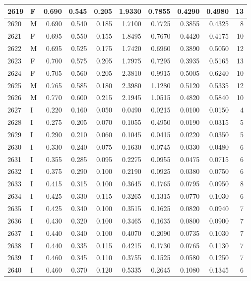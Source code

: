 \documentclass[9pt,twocolumn,twoside,]{pnas-new}
\begin{document}
\begin{tabular}{l|l|r|r|r|r|r|r|r|r}
\hline
2619 & F & 0.690 & 0.545 & 0.205 & 1.9330 & 0.7855 & 0.4290 & 0.4980 & 13\\
\hline
2620 & M & 0.690 & 0.540 & 0.185 & 1.7100 & 0.7725 & 0.3855 & 0.4325 & 8\\
\hline
2621 & F & 0.695 & 0.550 & 0.155 & 1.8495 & 0.7670 & 0.4420 & 0.4175 & 10\\
\hline
2622 & M & 0.695 & 0.525 & 0.175 & 1.7420 & 0.6960 & 0.3890 & 0.5050 & 12\\
\hline
2623 & F & 0.700 & 0.575 & 0.205 & 1.7975 & 0.7295 & 0.3935 & 0.5165 & 13\\
\hline
2624 & F & 0.705 & 0.560 & 0.205 & 2.3810 & 0.9915 & 0.5005 & 0.6240 & 10\\
\hline
2625 & M & 0.765 & 0.585 & 0.180 & 2.3980 & 1.1280 & 0.5120 & 0.5335 & 12\\
\hline
2626 & M & 0.770 & 0.600 & 0.215 & 2.1945 & 1.0515 & 0.4820 & 0.5840 & 10\\
\hline
2627 & I & 0.220 & 0.160 & 0.050 & 0.0490 & 0.0215 & 0.0100 & 0.0150 & 4\\
\hline
2628 & I & 0.275 & 0.205 & 0.070 & 0.1055 & 0.4950 & 0.0190 & 0.0315 & 5\\
\hline
2629 & I & 0.290 & 0.210 & 0.060 & 0.1045 & 0.0415 & 0.0220 & 0.0350 & 5\\
\hline
2630 & I & 0.330 & 0.240 & 0.075 & 0.1630 & 0.0745 & 0.0330 & 0.0480 & 6\\
\hline
2631 & I & 0.355 & 0.285 & 0.095 & 0.2275 & 0.0955 & 0.0475 & 0.0715 & 6\\
\hline
2632 & I & 0.375 & 0.290 & 0.100 & 0.2190 & 0.0925 & 0.0380 & 0.0750 & 6\\
\hline
2633 & I & 0.415 & 0.315 & 0.100 & 0.3645 & 0.1765 & 0.0795 & 0.0950 & 8\\
\hline
2634 & I & 0.425 & 0.330 & 0.115 & 0.3265 & 0.1315 & 0.0770 & 0.1030 & 6\\
\hline
2635 & I & 0.425 & 0.340 & 0.100 & 0.3515 & 0.1625 & 0.0820 & 0.0940 & 7\\
\hline
2636 & I & 0.430 & 0.320 & 0.100 & 0.3465 & 0.1635 & 0.0800 & 0.0900 & 7\\
\hline
2637 & I & 0.440 & 0.340 & 0.100 & 0.4070 & 0.2090 & 0.0735 & 0.1030 & 7\\
\hline
2638 & I & 0.440 & 0.335 & 0.115 & 0.4215 & 0.1730 & 0.0765 & 0.1130 & 7\\
\hline
2639 & I & 0.460 & 0.345 & 0.110 & 0.3755 & 0.1525 & 0.0580 & 0.1250 & 7\\
\hline
2640 & I & 0.460 & 0.370 & 0.120 & 0.5335 & 0.2645 & 0.1080 & 0.1345 & 6\\

\end{tabular}
\end{document}

